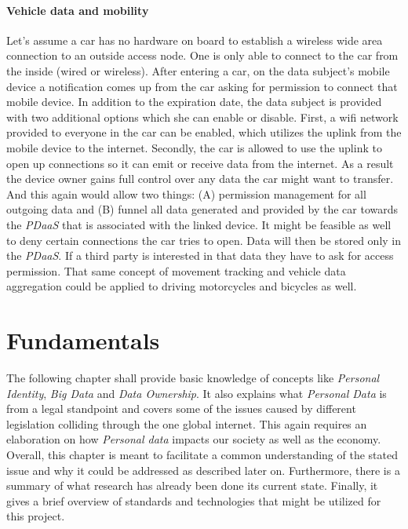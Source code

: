 \documentclass[12pt,english,a4paper,titlepage,cleardoublepage=empty,dottedtoc]{report}
\begin{document}
\subsubsection*{Vehicle data and
mobility}\label{vehicle-data-and-mobility}

Let's assume a car has no hardware on board to establish a wireless wide
area connection to an outside access node. One is only able to connect
to the car from the inside (wired or wireless). After entering a car, on
the data subject's mobile device a notification comes up from the car
asking for permission to connect that mobile device. In addition to the
expiration date, the data subject is provided with two additional
options which she can enable or disable. First, a wifi network provided
to everyone in the car can be enabled, which utilizes the uplink from
the mobile device to the internet. Secondly, the car is allowed to use
the uplink to open up connections so it can emit or receive data from
the internet. As a result the device owner gains full control over any
data the car might want to transfer. And this again would allow two
things: (A) permission management for all outgoing data and (B) funnel
all data generated and provided by the car towards the \emph{PDaaS} that
is associated with the linked device. It might be feasible as well to
deny certain connections the car tries to open. Data will then be stored
only in the \emph{PDaaS}. If a third party is interested in that data
they have to ask for access permission. That same concept of movement
tracking and vehicle data aggregation could be applied to driving
motorcycles and bicycles as well.

\hypertarget{fundamentals}{\chapter{Fundamentals}\label{fundamentals}}

The following chapter shall provide basic knowledge of concepts like
\emph{Personal Identity}, \emph{Big Data} and \emph{Data Ownership}. It
also explains what \emph{Personal Data} is from a legal standpoint and
covers some of the issues caused by different legislation colliding
through the one global internet. This again requires an elaboration on
how \emph{Personal data} impacts our society as well as the economy.
Overall, this chapter is meant to facilitate a common understanding of
the stated issue and why it could be addressed as described later on.
Furthermore, there is a summary of what research has already been done
its current state. Finally, it gives a brief overview of standards and
technologies that might be utilized for this project.
\end{document}

